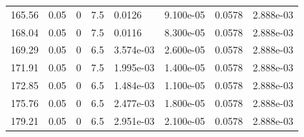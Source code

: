 \documentclass[preview]{standalone}
\begin{document}
{{{\begin{tabular}{L{1.2cm}C{1.2cm} C{0.3cm}C{0.5cm} C{1.4cm}C{1.4cm} C{1.4cm}C{1.4cm}}
  165.56  &  0.05  & 0     & 7.5 &  0.0126  & 9.100e-05  & 0.0578 &  2.888e-03   \\ 
  168.04  &  0.05  & 0     & 7.5 &  0.0116  & 8.300e-05  & 0.0578 &  2.888e-03   \\ 
  169.29  &  0.05  & 0     & 6.5 &  3.574e-03  & 2.600e-05  & 0.0578 &  2.888e-03   \\ 
  171.91  &  0.05  & 0     & 7.5 &  1.995e-03  & 1.400e-05  & 0.0578 &  2.888e-03   \\ 
  172.85  &  0.05  & 0     & 6.5 &  1.484e-03  & 1.100e-05  & 0.0578 &  2.888e-03   \\ 
  175.76  &  0.05  & 0     & 6.5 &  2.477e-03  & 1.800e-05  & 0.0578 &  2.888e-03   \\ 
  179.21  &  0.05  & 0     & 6.5 &  2.951e-03  & 2.100e-05  & 0.0578 &  2.888e-03   \\ 
\hline 
\end{tabular} 

}}}
\end{document}
